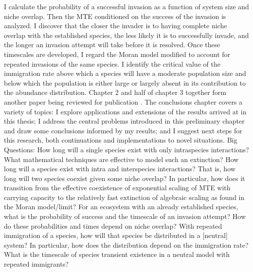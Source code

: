 I calculate the probability of a successful invasion as a function of system size and niche overlap. 
Then the MTE conditioned on the success of the invasion is analyzed. 
I discover that the closer the invader is to having complete niche overlap with the established species, the less likely it is to successfully invade, and the longer an invasion attempt will take before it is resolved. %
Once these timescales are developed, I regard the Moran model modified to account for repeated invasions of the same species. 
I identify the critical value of the immigration rate above which a species will have a moderate population size and below which the population is either large or largely absent in its contribution to the abundance distribution. %
Chapter 2 and half of chapter 3 together form another paper being reviewed for publication \cite{Badali2018}. %
The conclusions chapter covers a variety of topics: I explore applications and extensions of the results arrived at in this thesis; I address the central problems introduced in this preliminary chapter and draw some conclusions informed by my results; and I suggest next steps for this research, both continuations and implementations to novel situations. 
\fi
\iffalse
Big Questions:
How long will a single species exist with only intraspecies interactions?
What mathematical techniques are effective to model such an extinction? 
How long will a species exist with intra and interspecies interactions? That is, how long will two species coexist given some niche overlap? In particular, how does it transition from the effective coexistence of exponential scaling of MTE with carrying capacity to the relatively fast extinction of algebraic scaling as found in the Moran model/limit? 
For an ecosystem with an already established species, what is the probability of success and the timescale of an invasion attempt? How do these probabilities and times depend on niche overlap? 
With repeated immigration of a species, how will that species be distributed in a [neutral] system? In particular, how does the distribution depend on the immigration rate? 
What is the timescale of species transient existence in a neutral model with repeated immigrants? 
